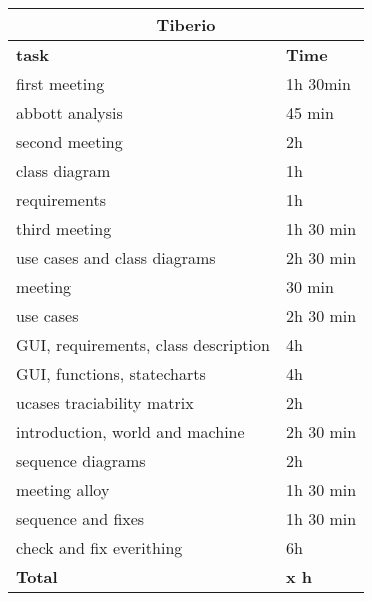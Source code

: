 \begin{table}[H]
\begin{tabular}{|l|l|}
\hline
\multicolumn{2}{|c|}{\textbf{Tiberio}}            \\ \hline
\textbf{task}                   & \textbf{Time} \\ \hline
first meeting                        & 1h 30min     \\ \hline
abbott analysis                      & 45 min    \\ \hline
second meeting                       & 2h        \\ \hline
class diagram                        & 1h        \\ \hline
requirements                         & 1h        \\ \hline
third meeting                        & 1h 30 min \\ \hline
use cases and class diagrams         & 2h 30 min \\ \hline
meeting                              & 30 min    \\ \hline
use cases                            & 2h 30 min \\ \hline
GUI, requirements, class description & 4h        \\ \hline
GUI, functions, statecharts          & 4h        \\ \hline
ucases traciability matrix           & 2h        \\ \hline
introduction, world and machine      & 2h 30 min \\ \hline
sequence diagrams                    & 2h        \\ \hline
meeting alloy                        & 1h 30 min \\ \hline
sequence and fixes                   & 1h 30 min \\ \hline
check and fix everithing             & 6h        \\ \hline
\rowcolor {polilight}
\textbf{Total}                  & \textbf{x h}   \\ \hline
\end{tabular}
\end{table}

